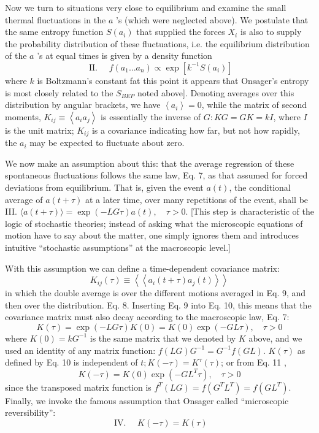 \documentclass{article}
\begin{document}
Now we turn to situations very close to equilibrium and examine the small thermal fluctuations in the $a$ 's (which were neglected above). We postulate that the same entropy function $S\left(a_i\right)$ that supplied the forces $X_i$ is also to supply the probability distribution of these fluctuations, i.e. the equilibrium distribution of the $a$ 's at equal times is given by a density function
$$
\text { II. } \quad f\left(a_1 \ldots a_n\right) \propto \exp \left[k^{-1} S\left(a_i\right)\right]
$$
where $k$ is Boltzmann's constant fat this point it appears that Onsager's entropy is most closely related to the $S_{B E P}$ noted above]. Denoting averages over this distribution by angular brackets, we have $\left\langle a_i\right\rangle=0$, while the matrix of second moments, $K_{i j} \equiv\left\langle a_i a_j\right\rangle$ is essentially the inverse of $G: K G=G K=k I$, where $I$ is the unit matrix; $K_{i j}$ is a covariance indicating how far, but not how rapidly, the $a_i$ may be expected to fluctuate about zero.

We now make an assumption about this: that the average regression of these spontaneous fluctuations follows the same law, Eq. 7, as that assumed for forced deviations from equilibrium. That is, given the event $a(t)$, the conditional average of $a(t+\tau)$ at a later time, over many repetitions of the event, shall be
III. $\langle a(t+\tau)\rangle=\exp (-L G \tau) a(t), \quad \tau>0$.
[This step is characteristic of the logic of stochastic theories; instead of asking what the microscopic equations of motion have to say about the matter, one simply ignores them and introduces intuitive ``stochastic assumptions'' at the macroscopic level.]

With this assumption we can define a time-dependent covariance matrix:
$$
K_{i j}(\tau) \equiv\left\langle\left\langle a_i(t+\tau) a_j(t)\right\rangle\right\rangle
$$
in which the double average is over the different motions averaged in Eq. 9, and then over the distribution. Eq. 8. Inserting Eq. 9 into Eq. 10, this means that the covariance matrix must also decay according to the macroscopic law, Eq. 7:
$$
K(\tau)=\exp (-L G \tau) K(0)=K(0) \exp (-G L \tau), \quad \tau>0
$$
where $K(0)=k G^{-1}$ is the same matrix that we denoted by $K$ above, and we used an identity of any matrix function: $f(L G) G^{-1}=G^{-1} f(G L)$. $K(\tau)$ as defined by Eq. 10 is independent of $t ; K(-\tau)=K^\tau(\tau)$; or from Eq. 11 ,
$$
K(-\tau)=K(0) \exp \left(-G L^T \tau\right), \quad \tau>0
$$
since the transposed matrix function is $f^T(L G)=f\left(G^T L^T\right)=f\left(G L^T\right)$.
Finally, we invoke the famous assumption that Onsager called ``microscopic reversibility'':
$$
\text { IV. } \quad K(-\tau)=K(\tau)
$$
\end{document}
